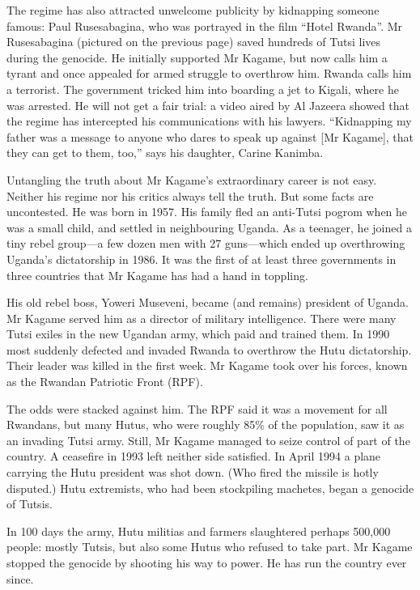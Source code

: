 \documentclass{article}
\begin{document}
The regime has also attracted unwelcome publicity by kidnapping someone famous: Paul Rusesabagina, who was portrayed in the film ``Hotel Rwanda''. Mr Rusesabagina (pictured on the previous page) saved hundreds of Tutsi lives during the genocide. He initially supported Mr Kagame, but now calls him a tyrant and once appealed for armed struggle to overthrow him. Rwanda calls him a terrorist. The government tricked him into boarding a jet to Kigali, where he was arrested. He will not get a fair trial: a video aired by Al Jazeera showed that the regime has intercepted his communications with his lawyers. ``Kidnapping my father was a message to anyone who dares to speak up against {[}Mr Kagame{]}, that they can get to them, too,'' says his daughter, Carine Kanimba. 

Untangling the truth about Mr Kagame's extraordinary career is not easy. Neither his regime nor his critics always tell the truth. But some facts are uncontested. He was born in 1957. His family fled an anti-Tutsi pogrom when he was a small child, and settled in neighbouring Uganda. As a teenager, he joined a tiny rebel group---a few dozen men with 27 guns---which ended up overthrowing Uganda's dictatorship in 1986. It was the first of at least three governments in three countries that Mr Kagame has had a hand in toppling. 

His old rebel boss, Yoweri Museveni, became (and remains) president of Uganda. Mr Kagame served him as a director of military intelligence. There were many Tutsi exiles in the new Ugandan army, which paid and trained them. In 1990 most suddenly defected and invaded Rwanda to overthrow the Hutu dictatorship. Their leader was killed in the first week. Mr Kagame took over his forces, known as the Rwandan Patriotic Front (RPF). 

The odds were stacked against him. The RPF said it was a movement for all Rwandans, but many Hutus, who were roughly 85\% of the population, saw it as an invading Tutsi army. Still, Mr Kagame managed to seize control of part of the country. A ceasefire in 1993 left neither side satisfied. In April 1994 a plane carrying the Hutu president was shot down. (Who fired the missile is hotly disputed.) Hutu extremists, who had been stockpiling machetes, began a genocide of Tutsis. 

In 100 days the army, Hutu militias and farmers slaughtered perhaps 500,000 people: mostly Tutsis, but also some Hutus who refused to take part. Mr Kagame stopped the genocide by shooting his way to power. He has run the country ever since. 
\end{document}

